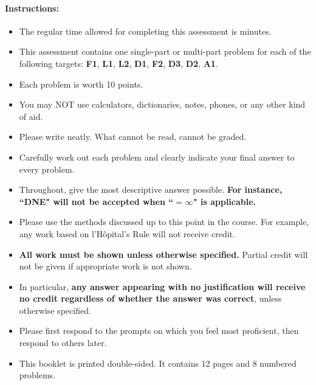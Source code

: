 \documentclass[11pt]{article}
\begin{document}
{%

\paragraph*{Instructions:}

\begin{itemize}
    
    \item The regular time allowed for completing this assessment is  minutes.
    \item This assessment contains one single-part or multi-part problem for each of the following targets: {\bf\color{ProcessBlue}F1}, {\bf\color{RoyalBlue}L1}, {\bf\color{RoyalBlue}L2}, {\bf\color{ForestGreen}D1}, {\bf\color{ProcessBlue}F2}, {\bf\color{ForestGreen}D3}, {\bf\color{ForestGreen}D2}, {\bf\color{RedOrange}A1}.
    \item Each problem is worth 10 points.
    \item You may NOT use calculators, dictionaries, notes, phones, or any other kind of aid.
    \item Please write neatly. What cannot be read, cannot be graded.
    \item Carefully work out each problem and clearly indicate your final answer to every problem.
    \item Throughout, give the most descriptive answer possible. \textbf{For instance, ``DNE" will not be accepted when ``$=\infty$" is applicable.}
    \item Please use the methods discussed up to this point in the course. For example, any work based on l'H\^opital's Rule will not receive credit.
    \item \textbf{All work must be shown unless otherwise specified.} Partial credit will not be given if appropriate work is not shown.
    \item In particular, {\bf any answer appearing with no justification will receive no credit regardless of whether the answer was correct}, unless otherwise specified.
    \item Please first respond to the prompts on which you feel most proficient, then respond to others later.
    \item This booklet is printed double-sided. It contains 12 pages and 8 numbered problems.
    \end{itemize}
    
    }
\end{document}

